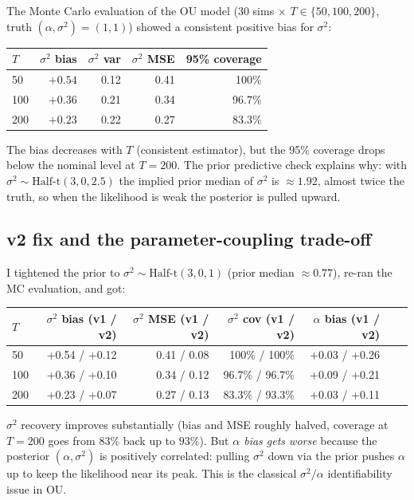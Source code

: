 \documentclass[11pt,a4paper]{article}
\begin{document}
The Monte Carlo evaluation of the OU model (30 sims $\times$
$T \in \{50, 100, 200\}$, truth $(\alpha,\sigma^2) = (1, 1)$)
showed a consistent positive bias for $\sigma^2$:

\begin{center}
\begin{tabular}{lrrrr}
\toprule
$T$ & $\sigma^2$ bias & $\sigma^2$ var & $\sigma^2$ MSE & 95\% coverage \\
\midrule
50  & $+0.54$ & 0.12 & 0.41 & 100\% \\
100 & $+0.36$ & 0.21 & 0.34 & 96.7\% \\
200 & $+0.23$ & 0.22 & 0.27 & 83.3\% \\
\bottomrule
\end{tabular}
\end{center}

\noindent The bias decreases with $T$ (consistent estimator), but
the 95\% coverage drops below the nominal level at $T = 200$. The
prior predictive check explains why: with $\sigma^2 \sim
\mathrm{Half\text{-}t}(3, 0, 2.5)$ the implied prior median of
$\sigma^2$ is $\approx 1.92$, almost twice the truth, so when the
likelihood is weak the posterior is pulled upward.

\subsection*{v2 fix and the parameter-coupling trade-off}

I tightened the prior to $\sigma^2 \sim \mathrm{Half\text{-}t}(3, 0, 1)$
(prior median $\approx 0.77$), re-ran the MC evaluation, and got:

\begin{center}\small
\begin{tabular}{lrrrrrr}
\toprule
$T$ & $\sigma^2$ bias (v1 / v2) & $\sigma^2$ MSE (v1 / v2)
    & $\sigma^2$ cov (v1 / v2) & $\alpha$ bias (v1 / v2) \\
\midrule
50  & +0.54 / +0.12 & 0.41 / 0.08 & 100\% / 100\%   & +0.03 / +0.26 \\
100 & +0.36 / +0.10 & 0.34 / 0.12 & 96.7\% / 96.7\% & +0.09 / +0.21 \\
200 & +0.23 / +0.07 & 0.27 / 0.13 & 83.3\% / 93.3\% & +0.03 / +0.11 \\
\bottomrule
\end{tabular}
\end{center}

\noindent $\sigma^2$ recovery improves substantially (bias and MSE
roughly halved, coverage at $T = 200$ goes from $83\%$ back up to
$93\%$). But \emph{$\alpha$ bias gets worse} because the posterior
$(\alpha, \sigma^2)$ is positively correlated: pulling $\sigma^2$
down via the prior pushes $\alpha$ up to keep the likelihood near
its peak. This is the classical $\sigma^2 / \alpha$ identifiability
issue in OU.
\end{document}
